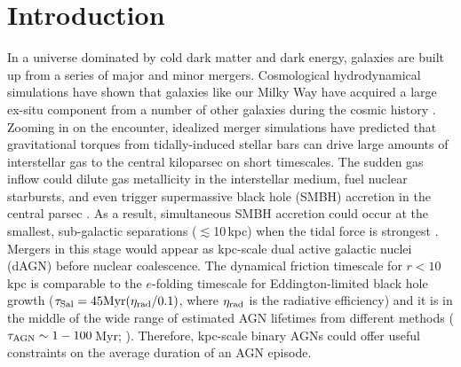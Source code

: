 \documentclass[iop,revtex4,twocolumn,apj,numberedappendix,appendixfloats]{emulateapj}
\begin{document}

\section{Introduction} \label{sec:intro}

In a universe dominated by cold dark matter and dark energy, galaxies are built up from a series of major and minor mergers. Cosmological hydrodynamical simulations have shown that galaxies like our Milky Way have acquired a large ex-situ component from a number of other galaxies during the cosmic history \citep[e.g., ][]{Rodriguez-Gomez16,Pillepich18}. Zooming in on the encounter, idealized merger simulations have predicted that gravitational torques from tidally-induced stellar bars can drive large amounts of interstellar gas to the central kiloparsec on short timescales. The sudden gas inflow could dilute gas metallicity in the interstellar medium, fuel nuclear starbursts, and even trigger supermassive black hole (SMBH) accretion in the central parsec \citep[e.g.,][]{Barnes91,Torrey12,Capelo17a}. As a result, simultaneous SMBH accretion could occur at the smallest, sub-galactic separations ($\lesssim$10\,kpc) when the tidal force is strongest \citep[e.g.,][]{Van-Wassenhove12,Blecha13,Rosas-Guevara18}. Mergers in this stage would appear as kpc-scale dual active galactic nuclei (dAGN) before nuclear coalescence. The dynamical friction timescale for $r < 10$\,kpc is comparable to the \citet{Salpeter64} $e$-folding timescale for Eddington-limited black hole growth ($\tau_{\rm Sal} = 45 {\rm Myr} (\eta_{\rm rad}/0.1)$, where $\eta_{\rm rad}$ is the radiative efficiency) and it is in the middle of the wide range of estimated AGN lifetimes from different methods ($\tau_{\rm AGN} \sim 1-100$\,Myr; \citealt{Martini04,Hopkins05a}). Therefore, kpc-scale binary AGNs could offer useful constraints on the average duration of an AGN episode.
\end{document}
